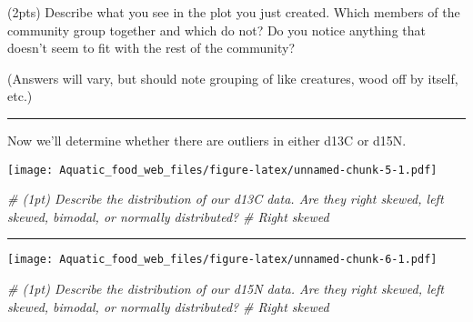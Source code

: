 \documentclass[]{article}
\newenvironment{Shaded}{\begin{snugshade}}{\end{snugshade}}
\newcommand{\KeywordTok}[1]{\textcolor[rgb]{0.13,0.29,0.53}{\textbf{#1}}}
\newcommand{\DataTypeTok}[1]{\textcolor[rgb]{0.13,0.29,0.53}{#1}}
\newcommand{\StringTok}[1]{\textcolor[rgb]{0.31,0.60,0.02}{#1}}
\newcommand{\CommentTok}[1]{\textcolor[rgb]{0.56,0.35,0.01}{\textit{#1}}}
\newcommand{\OperatorTok}[1]{\textcolor[rgb]{0.81,0.36,0.00}{\textbf{#1}}}
\newcommand{\NormalTok}[1]{#1}
\begin{document}
(2pts) Describe what you see in the plot you just created. Which members
of the community group together and which do not? Do you notice anything
that doesn't seem to fit with the rest of the community?

(Answers will vary, but should note grouping of like creatures, wood off
by itself, etc.)

\begin{center}\rule{0.5\linewidth}{\linethickness}\end{center}

Now we'll determine whether there are outliers in either d13C or d15N.

\begin{Shaded}
\end{Shaded}

\texttt{[image: Aquatic\_food\_web\_files/figure-latex/unnamed-chunk-5-1.pdf]}

\begin{Shaded}
\begin{Highlighting}[]
\CommentTok{# (1pt) Describe the distribution of our d13C data. Are they right skewed, left skewed, bimodal, or normally distributed?}
\CommentTok{# Right skewed}
\end{Highlighting}
\end{Shaded}

\begin{center}\rule{0.5\linewidth}{\linethickness}\end{center}

\begin{Shaded}
\end{Shaded}

\texttt{[image: Aquatic\_food\_web\_files/figure-latex/unnamed-chunk-6-1.pdf]}

\begin{Shaded}
\begin{Highlighting}[]
\CommentTok{# (1pt) Describe the distribution of our d15N data. Are they right skewed, left skewed, bimodal, or normally distributed?}
\CommentTok{# Right skewed}
\end{Highlighting}
\end{Shaded}
\end{document}

